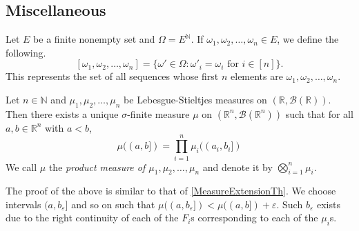 \subsection{Miscellaneous}

Let $E$ be a finite nonempty set and $\Omega = E^\mathbb{N}$. If $\omega_1,\omega_2,\ldots,\omega_n\in E$, we define the following.
$$[\omega_1,\omega_2,\ldots,\omega_n]=\{\omega'\in\Omega : \omega'_i=\omega_i\text{ for }i\in[n]\}.$$
This represents the set of all sequences whose first $n$ elements are $\omega_1,\omega_2,\ldots,\omega_n$.

\begin{theorem}
        Let $n\in\mathbb{N}$ and $\mu_1,\mu_2,\ldots,\mu_n$ be Lebesgue-Stieltjes measures on $(\mathbb{R},\mathcal{B}(\mathbb{R}))$. Then there exists a unique $\sigma$-finite measure $\mu$ on $(\mathbb{R}^n, \mathcal{B}(\mathbb{R}^n))$ such that for all $a,b\in\mathbb{R}^n$ with $a<b$,
        $$\mu((a,b])=\prod_{i=1}^n \mu_i((a_i,b_i])$$
        We call $\mu$ the \textit{product measure of $\mu_1,\mu_2,\ldots,\mu_n$} and denote it by $\bigotimes_{i=1}^n\mu_i$.
\end{theorem}

The proof of the above is similar to that of \cref{MeasureExtensionTh}. We choose intervals $(a,b_\varepsilon]$ and so on such that $\mu((a,b_\varepsilon])<\mu((a,b])+\varepsilon$. Such $b_\varepsilon$ exists due to the right continuity of each of the $F_i$s corresponding to each of the $\mu_i$s.

\clearpage